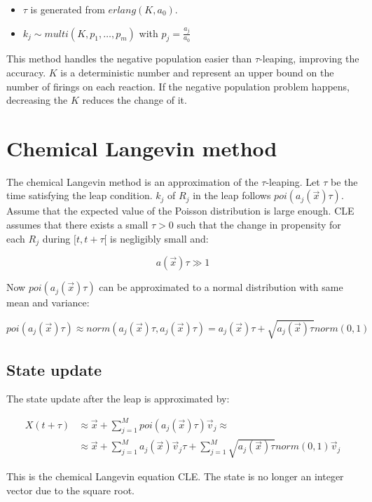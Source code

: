     \begin{multicols}{2}
      \begin{itemize}
        \item $\tau$ is generated from $erlang(K, a_0)$.
      \item $k_j\sim multi(K, p_1, \dots, p_m)$ with $p_j = \frac{a_j}{a_0}$
      \end{itemize}
    \end{multicols}

    This method handles the negative population easier than $\tau$-leaping, improving the accuracy.
    $K$ is a deterministic number and represent an upper bound on the number of firings on each reaction.
    If the negative population problem happens, decreasing the $K$ reduces the change of it.

\section{Chemical Langevin method}
The chemical Langevin method is an approximation of the $\tau$-leaping.
Let $\tau$ be the time satisfying the leap condition.
$k_j$ of $R_j$ in the leap follows $poi(a_j(\vec{x})\tau)$.
Assume that the expected value of the Poisson distribution is large enough.
CLE assumes that there exists a small $\tau>0$ such that the change in propensity for each $R_j$ during $[t,t+\tau[$ is negligibly small and:

$$a(\vec{x})\tau\gg 1$$

Now $poi(a_j(\vec{x})\tau)$ can be approximated to a normal distribution with same mean and variance:

$$poi(a_j(\vec{x})\tau)\approx norm(a_j(\vec{x})\tau, a_j(\vec{x})\tau) = a_j(\vec{x})\tau + \sqrt{a_j(\vec{x})\tau}norm(0,1)$$

  \subsection{State update}
  The state update after the leap is approximated by:

  \begin{align*}
    X(t+\tau)&\approx \vec{x} + \sum\limits_{j=1}^M poi(a_j(\vec{x})\tau)\vec{v}_j \approx\\
             &\approx \vec{x}+\sum\limits_{j=1}^Ma_j(\vec{x})\vec{v}_j\tau + \sum\limits_{j=1}^M\sqrt{a_j(\vec{x})\tau}norm(0,1)\vec{v}_j
  \end{align*}

  This is the chemical Langevin equation CLE.
  The state is no longer an integer vector due to the square root.

